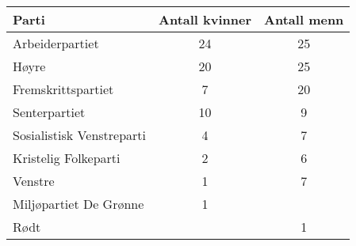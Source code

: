 %


\Oppgave[4]

\begin{table}[H]
  \centering
  \caption{}
  \begin{tabular}{| l | *{2}{S[table-format=2.0]|}}
    \Rowcolor
    Parti  \headerstrut       & {Antall kvinner} & {Antall menn} \\ \hline
    Arbeiderpartiet           &        24        &      25       \\ \hline
    Høyre                     &        20        &      25       \\ \hline
    Fremskrittspartiet        &         7        &      20       \\ \hline
    Senterpartiet             &        10        &       9       \\ \hline
    Sosialistisk Venstreparti &         4        &       7       \\ \hline
    Kristelig Folkeparti      &         2        &       6       \\ \hline
    Venstre                   &         1        &       7       \\ \hline
    Miljøpartiet De Grønne    &         1        &               \\ \hline
    Rødt                      &                  &       1       \\ \hline
  \end{tabular}
  \label{tab:Forkurs-1p-2p-laererutdanning-2018-V-oppgave-2-1}
\end{table}


